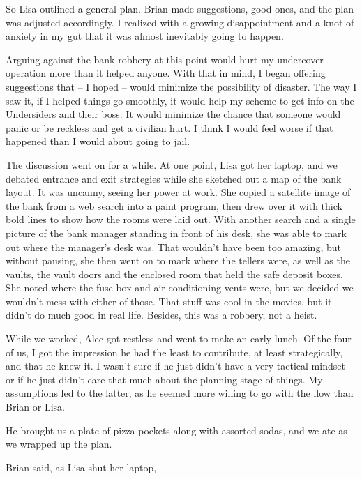 So Lisa outlined a general plan. Brian made suggestions, good ones, and the plan was adjusted accordingly. I realized with a growing disappointment and a knot of anxiety in my gut that it was almost inevitably going to happen.

Arguing against the bank robbery at this point would hurt my undercover operation more than it helped anyone. With that in mind, I began offering suggestions that -- I hoped -- would minimize the possibility of disaster. The way I saw it, if I helped things go smoothly, it would help my scheme to get info on the Undersiders and their boss. It would minimize the chance that someone would panic or be reckless and get a civilian hurt. I think I would feel worse if that happened than I would about going to jail.

The discussion went on for a while. At one point, Lisa got her laptop, and we debated entrance and exit strategies while she sketched out a map of the bank layout. It was uncanny, seeing her power at work. She copied a satellite image of the bank from a web search into a paint program, then drew over it with thick bold lines to show how the rooms were laid out. With another search and a single picture of the bank manager standing in front of his desk, she was able to mark out where the manager's desk was. That wouldn't have been too amazing, but without pausing, she then went on to mark where the tellers were, as well as the vaults, the vault doors and the enclosed room that held the safe deposit boxes. She noted where the fuse box and air conditioning vents were, but we decided we wouldn't mess with either of those. That stuff was cool in the movies, but it didn't do much good in real life. Besides, this was a robbery, not a heist.

While we worked, Alec got restless and went to make an early lunch. Of the four of us, I got the impression he had the least to contribute, at least strategically, and that he knew it. I wasn't sure if he just didn't have a very tactical mindset or if he just didn't care that much about the planning stage of things. My assumptions led to the latter, as he seemed more willing to go with the flow than Brian or Lisa.

He brought us a plate of pizza pockets along with assorted sodas, and we ate as we wrapped up the plan.

 Brian said, as Lisa shut her laptop, 

